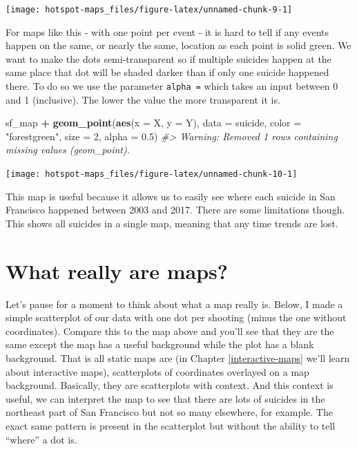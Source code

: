 \documentclass[
  12pt,
]{book}
\newenvironment{Shaded}{\begin{snugshade}}{\end{snugshade}}
\newcommand{\CommentTok}[1]{\textcolor[rgb]{0.56,0.35,0.01}{\textit{#1}}}
\newcommand{\DataTypeTok}[1]{\textcolor[rgb]{0.13,0.29,0.53}{#1}}
\newcommand{\DecValTok}[1]{\textcolor[rgb]{0.00,0.00,0.81}{#1}}
\newcommand{\FloatTok}[1]{\textcolor[rgb]{0.00,0.00,0.81}{#1}}
\newcommand{\KeywordTok}[1]{\textcolor[rgb]{0.13,0.29,0.53}{\textbf{#1}}}
\newcommand{\NormalTok}[1]{#1}
\newcommand{\OperatorTok}[1]{\textcolor[rgb]{0.81,0.36,0.00}{\textbf{#1}}}
\newcommand{\StringTok}[1]{\textcolor[rgb]{0.31,0.60,0.02}{#1}}
\begin{document}
\begin{center}\texttt{[image: hotspot-maps\_files/figure-latex/unnamed-chunk-9-1]} \end{center}

For maps like this - with one point per event - it is hard to tell if any events happen on the same, or nearly the same, location as each point is solid green. We want to make the dots semi-transparent so if multiple suicides happen at the same place that dot will be shaded darker than if only one suicide happened there. To do so we use the parameter \texttt{alpha\ =} which takes an input between 0 and 1 (inclusive). The lower the value the more transparent it is.

\begin{Shaded}
\begin{Highlighting}[]
\NormalTok{sf\_map }\OperatorTok{+}
\StringTok{  }\KeywordTok{geom\_point}\NormalTok{(}\KeywordTok{aes}\NormalTok{(}\DataTypeTok{x =}\NormalTok{ X, }\DataTypeTok{y =}\NormalTok{ Y),}
             \DataTypeTok{data  =}\NormalTok{ suicide,}
             \DataTypeTok{color =} \StringTok{"forestgreen"}\NormalTok{,}
             \DataTypeTok{size  =} \DecValTok{2}\NormalTok{,}
             \DataTypeTok{alpha =} \FloatTok{0.5}\NormalTok{)}
\CommentTok{\#> Warning: Removed 1 rows containing missing values (geom\_point).}
\end{Highlighting}
\end{Shaded}

\begin{center}\texttt{[image: hotspot-maps\_files/figure-latex/unnamed-chunk-10-1]} \end{center}

This map is useful because it allows us to easily see where each suicide in San Francisco happened between 2003 and 2017. There are some limitations though. This shows all suicides in a single map, meaning that any time trends are lost.

\hypertarget{what-really-are-maps}{%
\section{What really are maps?}\label{what-really-are-maps}}

Let's pause for a moment to think about what a map really is. Below, I made a simple scatterplot of our data with one dot per shooting (minus the one without coordinates). Compare this to the map above and you'll see that they are the same except the map has a useful background while the plot has a blank background. That is all static maps are (in Chapter \ref{interactive-maps} we'll learn about interactive maps), scatterplots of coordinates overlayed on a map background. Basically, they are scatterplots with context. And this context is useful, we can interpret the map to see that there are lots of suicides in the northeast part of San Francisco but not so many elsewhere, for example. The exact same pattern is present in the scatterplot but without the ability to tell ``where'' a dot is.
\end{document}
